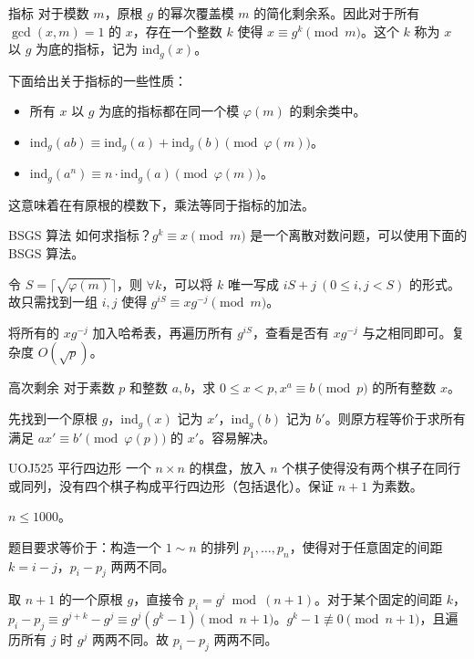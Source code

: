 \documentclass [hyperref={bookmarksdepth=4}, aspectratio=169] {beamer}
\theoremstyle {fy}
\begin{document}
\begin{frame}{指标}
对于模数 $m$，原根 $g$ 的幂次覆盖模 $m$ 的简化剩余系。因此对于所有 $\gcd(x,m)=1$ 的 $x$，存在一个整数 $k$ 使得 $x\equiv g^k\pmod m$。这个 $k$ 称为 $x$ 以 $g$ 为底的指标，记为 $\mathrm{ind}_g(x)$。

下面给出关于指标的一些性质：

\begin{itemize}
    \item 所有 $x$ 以 $g$ 为底的指标都在同一个模 $\varphi(m)$ 的剩余类中。
    \item $\mathrm{ind}_g(ab)\equiv \mathrm{ind}_g(a)+\mathrm{ind}_g(b)\pmod {\varphi(m)}$。
    \item $\mathrm{ind}_g(a^n)\equiv n\cdot \mathrm{ind}_g(a)\pmod{\varphi(m)}$。
\end{itemize}

这意味着在有原根的模数下，乘法等同于指标的加法。
\end{frame}

\begin{frame}{BSGS 算法}
如何求指标？$g^k\equiv x\pmod m$ 是一个离散对数问题，可以使用下面的 BSGS 算法。

令 $S=\lceil\sqrt{\varphi(m)}\rceil$，则 $\forall k$，可以将 $k$ 唯一写成 $iS+j\ (0\le i,j<S)$ 的形式。故只需找到一组 $i,j$ 使得 $g^{iS}\equiv xg^{-j}\pmod m$。

将所有的 $xg^{-j}$ 加入哈希表，再遍历所有 $g^{iS}$，查看是否有 $xg^{-j}$ 与之相同即可。复杂度 $O(\sqrt{p})$。
\end{frame}

\begin{frame}{高次剩余}
对于素数 $p$ 和整数 $a,b$，求 $0\le x<p,x^a\equiv b\pmod p$ 的所有整数 $x$。

先找到一个原根 $g$，$\mathrm{ind}_g(x)$ 记为 $x'$，$\mathrm{ind}_g(b)$ 记为 $b'$。则原方程等价于求所有满足 $ax'\equiv b'\pmod {\varphi(p)}$ 的 $x'$。容易解决。
\end{frame}

\begin{frame}{UOJ525 平行四边形}
一个 $n\times n$ 的棋盘，放入 $n$ 个棋子使得没有两个棋子在同行或同列，没有四个棋子构成平行四边形（包括退化）。保证 $n+1$ 为素数。

$n\le 1000$。

 题目要求等价于：构造一个 $1\sim n$ 的排列 $p_1,\dots,p_n$，使得对于任意固定的间距 $k=i-j$，$p_i-p_j$ 两两不同。

取 $n+1$ 的一个原根 $g$，直接令 $p_i=g^i\bmod (n+1)$。对于某个固定的间距 $k$，$p_{i}-p_j\equiv g^{j+k}-g^j\equiv g^j(g^k-1)\pmod {n+1}$。$g^k-1\not\equiv 0\pmod {n+1}$，且遍历所有 $j$ 时 $g^j$ 两两不同。故 $p_i-p_j$ 两两不同。
\end{frame}
\end{document}
